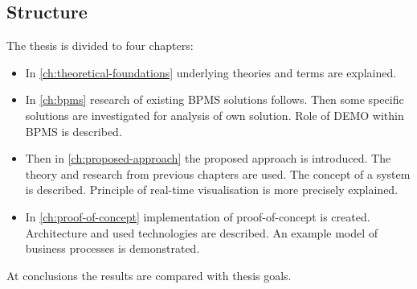
\subsection{Structure}
The thesis is divided to four chapters:
\begin{itemize}
\item In \cref{ch:theoretical-foundations} underlying theories and terms are explained.
\item In \cref{ch:bpms} research of existing BPMS solutions follows. Then some specific solutions are investigated for analysis of own solution. Role of DEMO within BPMS is described. 
\item Then in \cref{ch:proposed-approach} the proposed approach is introduced. The theory and research from previous chapters are used. The concept of a system is described. Principle of real-time visualisation is more precisely explained. 
\item In \cref{ch:proof-of-concept} implementation of proof-of-concept is created. Architecture and used technologies are described. An example model of business processes is demonstrated.
\end{itemize}
At conclusions the results are compared with thesis goals.




